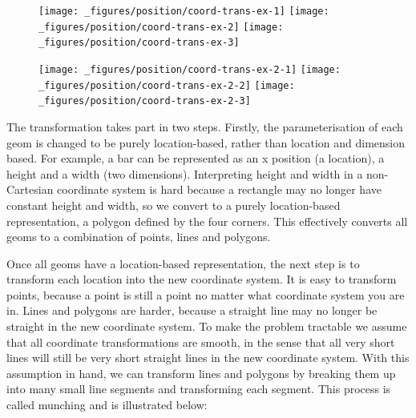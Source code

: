 \begin{figure}[H]
  \texttt{[image: \_figures/position/coord-trans-ex-1]}%
  \texttt{[image: \_figures/position/coord-trans-ex-2]}%
  \texttt{[image: \_figures/position/coord-trans-ex-3]}
\end{figure}

\begin{Shaded}
\begin{Highlighting}[]
\StringTok{ }\NormalTok{()}
\StringTok{ }\NormalTok{(} \NormalTok{)}
\StringTok{ }\NormalTok{()}
\end{Highlighting}
\end{Shaded}

\begin{figure}[H]
  \texttt{[image: \_figures/position/coord-trans-ex-2-1]}%
  \texttt{[image: \_figures/position/coord-trans-ex-2-2]}%
  \texttt{[image: \_figures/position/coord-trans-ex-2-3]}
\end{figure}

The transformation takes part in two steps. Firstly, the
parameterisation of each geom is changed to be purely location-based,
rather than location and dimension based. For example, a bar can be
represented as an x position (a location), a height and a width (two
dimensions). Interpreting height and width in a non-Cartesian coordinate
system is hard because a rectangle may no longer have constant height
and width, so we convert to a purely location-based representation, a
polygon defined by the four corners. This effectively converts all geoms
to a combination of points, lines and polygons.
 

Once all geoms have a location-based representation, the next step is to
transform each location into the new coordinate system. It is easy to
transform points, because a point is still a point no matter what
coordinate system you are in. Lines and polygons are harder, because a
straight line may no longer be straight in the new coordinate system. To
make the problem tractable we assume that all coordinate transformations
are smooth, in the sense that all very short lines will still be very
short straight lines in the new coordinate system. With this assumption
in hand, we can transform lines and polygons by breaking them up into
many small line segments and transforming each segment. This process is
called munching and is illustrated below: 

